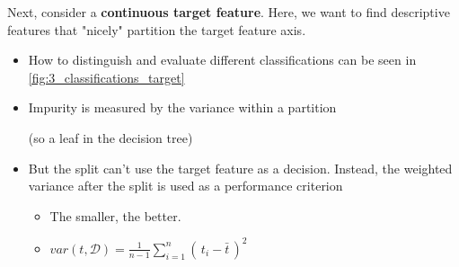Next, consider a \textbf{continuous target feature}. Here, we want to find descriptive features that "nicely" partition the target feature axis. 
\begin{itemize}
  \item How to distinguish and evaluate different classifications can be seen in \ref{fig:3_classifications_target}
  \item Impurity is measured by the variance within a partition \begin{note}{\footnotesize(so a leaf in the decision tree)}\end{note} 
  \item But the split can't use the target feature as a decision. Instead, the weighted variance after the split is used as a performance criterion
  \begin{itemize}
    \item The smaller, the better.
    \item $var(t, \mathcal{D}) = \frac{1}{n-1} \sum_{i=1}^{n}(\,t_i-\bar{t}\,)^2$
  \end{itemize}
\end{itemize}

